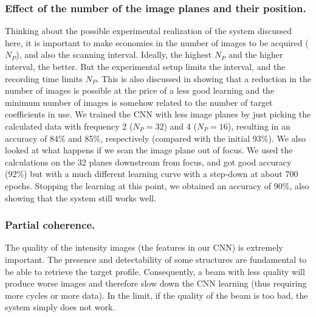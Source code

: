 \documentclass[preprint]{iucr}
\begin{document}
\subsubsection{Effect of the number of the image planes and their position.}
Thinking about the possible experimental realization of the system discussed here, it is important to make economies in the number of images to be acquired ($N_P$), and also the scanning interval. Ideally, the highest $N_P$ and the higher interval, the better. But the experimental setup limits the interval, and the recording time limits $N_P$. This is also discussed in \cite{Saha2020} showing that a reduction in the number of images is possible at the price of a less good learning and the minimum number of images is somehow related to the number of target coefficients in use. We trained the CNN with less image planes by just picking the calculated data with frequency 2 ($N_P=32$) and 4 ($N_P=16$), resulting in an accuracy of 84\% and 85\%, respectively (compared with the initial 93\%). 
We also looked at what happens if we scan the image plane out of focus. We used the calculations on the 32 planes downstream from focus, and got good accuracy (92\%) but with a much different learning curve with a step-down at about 700 epochs. Stopping the learning at this point, we obtained an accuracy of 90\%, also showing that the system still works well. 



\subsubsection{Partial coherence.}
The quality of the intensity images (the features in our CNN) is extremely important. The presence and detectability of some structures are fundamental to be able to retrieve the target profile. Consequently, a beam with less quality will produce worse images and therefore slow down the CNN learning (thus requiring more cycles or more data). In the limit, if the quality of the beam is too bad, the system simply does not work.  
\end{document}

